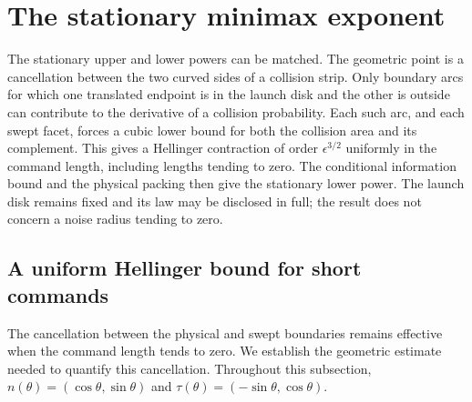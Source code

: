 \section{The stationary minimax exponent}
\label{sec:sharp-stationary}
The stationary upper and lower powers can be matched. The geometric
point is a cancellation between the two curved sides of a collision
strip. Only boundary arcs for which one translated endpoint is in the
launch disk and the other is outside can contribute to the derivative
of a collision probability. Each such arc, and each swept facet, forces
a cubic lower bound for both the collision area and its complement.
This gives a Hellinger contraction of order $\epsilon^{3/2}$ uniformly
in the command length, including lengths tending to zero. The conditional
information bound and the physical packing then give the stationary
lower power. The launch disk remains fixed and its law may be disclosed
in full; the result does not concern a noise radius tending to zero.

\subsection{A uniform Hellinger bound for short commands}
The cancellation between the physical and swept boundaries remains
effective when the command length tends to zero. We establish the
geometric estimate needed to quantify this cancellation. Throughout this
subsection, $n(\theta)=(\cos\theta,\sin\theta)$ and
$\tau(\theta)=(-\sin\theta,\cos\theta)$.

